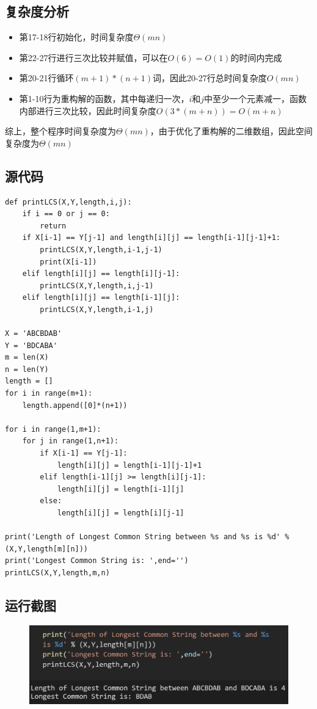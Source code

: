 \documentclass{ctexart}[UTF8]
\begin{document}
    \subsection{复杂度分析}
    \begin{itemize}
        \item 第17-18行初始化，时间复杂度$\Theta(mn)$
        \item 第22-27行进行三次比较并赋值，可以在$O(6) = O(1)$的时间内完成
        \item 第20-21行循环$(m+1)*(n+1)$词，因此20-27行总时间复杂度$O(mn)$
        \item 第1-10行为重构解的函数，其中每递归一次，$i$和$j$中至少一个元素减一，函数内部进行三次比较，因此时间复杂度$O(3*(m+n)) = O(m+n)$
    \end{itemize}
    \par 综上，整个程序时间复杂度为$\Theta(mn)$，由于优化了重构解的二维数组，因此空间复杂度为$\Theta(mn)$
    \subsection{源代码}
    \begin{lstlisting}
def printLCS(X,Y,length,i,j):
    if i == 0 or j == 0:
        return
    if X[i-1] == Y[j-1] and length[i][j] == length[i-1][j-1]+1:
        printLCS(X,Y,length,i-1,j-1)
        print(X[i-1])
    elif length[i][j] == length[i][j-1]:
        printLCS(X,Y,length,i,j-1)
    elif length[i][j] == length[i-1][j]:
        printLCS(X,Y,length,i-1,j)
        
X = 'ABCBDAB'
Y = 'BDCABA'
m = len(X)
n = len(Y)
length = []
for i in range(m+1):
    length.append([0]*(n+1))

for i in range(1,m+1):
    for j in range(1,n+1):
        if X[i-1] == Y[j-1]:
            length[i][j] = length[i-1][j-1]+1
        elif length[i-1][j] >= length[i][j-1]:
            length[i][j] = length[i-1][j]
        else:
            length[i][j] = length[i][j-1]

print('Length of Longest Common String between %s and %s is %d' % (X,Y,length[m][n]))
print('Longest Common String is: ',end='')
printLCS(X,Y,length,m,n)
    \end{lstlisting}
    \subsection{运行截图}
    \begin{figure}[H]
        \centering
        \includegraphics[width=12cm]{resources/8_1.png}
    \end{figure}
    \clearpage
\end{document}
